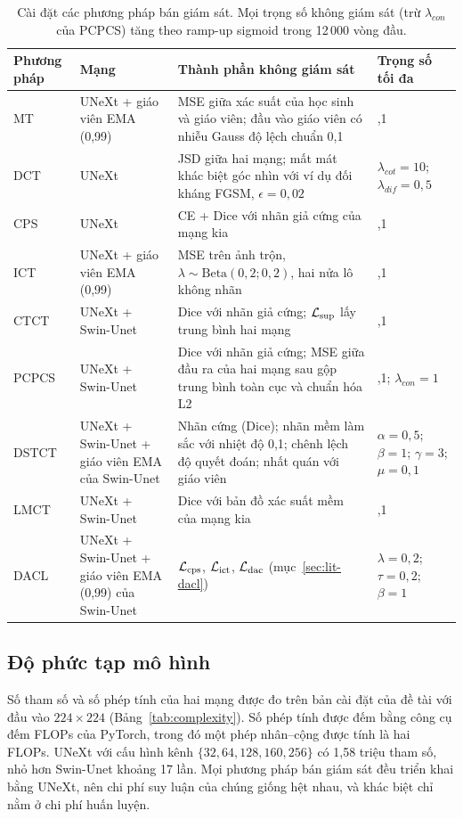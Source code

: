 \begin{table}[ht]
\centering
\caption{Cài đặt các phương pháp bán giám sát. Mọi trọng số không giám sát (trừ $\lambda_{con}$ của PCPCS) tăng theo ramp-up sigmoid trong 12\,000 vòng đầu.}
\label{tab:baselines}
\footnotesize
\begin{tabularx}{\textwidth}{>{\raggedright\arraybackslash}p{1.4cm} >{\raggedright\arraybackslash}p{3.2cm} >{\raggedright\arraybackslash}X >{\raggedright\arraybackslash}p{2.6cm}}
\toprule
Phương pháp & Mạng & Thành phần không giám sát & Trọng số tối đa \\
\midrule
MT & UNeXt + giáo viên EMA (0,99) & MSE giữa xác suất của học sinh và giáo viên; đầu vào giáo viên có nhiễu Gauss độ lệch chuẩn 0,1 & 0,1 \\
DCT & 2 UNeXt & JSD giữa hai mạng; mất mát khác biệt góc nhìn với ví dụ đối kháng FGSM, $\epsilon=0{,}02$ & $\lambda_{cot}=10$; $\lambda_{dif}=0{,}5$ \\
CPS & 2 UNeXt & CE + Dice với nhãn giả cứng của mạng kia & 0,1 \\
ICT & UNeXt + giáo viên EMA (0,99) & MSE trên ảnh trộn, $\lambda\sim\mathrm{Beta}(0{,}2;0{,}2)$, hai nửa lô không nhãn & 0,1 \\
CTCT & UNeXt + Swin-Unet & Dice với nhãn giả cứng; $\mathcal{L}_{\mathrm{sup}}$ lấy trung bình hai mạng & 0,1 \\
PCPCS & UNeXt + Swin-Unet & Dice với nhãn giả cứng; MSE giữa đầu ra của hai mạng sau gộp trung bình toàn cục và chuẩn hóa L2 & 0,1; $\lambda_{con}=1$ \\
DSTCT & UNeXt + Swin-Unet + giáo viên EMA của Swin-Unet & Nhãn cứng (Dice); nhãn mềm làm sắc với nhiệt độ 0,1; chênh lệch độ quyết đoán; nhất quán với giáo viên & $\alpha=0{,}5$; $\beta=1$; $\gamma=3$; $\mu=0{,}1$ \\
LMCT & UNeXt + Swin-Unet & Dice với bản đồ xác suất mềm của mạng kia & 0,1 \\
DACL & UNeXt + Swin-Unet + giáo viên EMA (0,99) của Swin-Unet & $\mathcal{L}_{\mathrm{cps}}$, $\mathcal{L}_{\mathrm{ict}}$, $\mathcal{L}_{\mathrm{dac}}$ (mục~\ref{sec:lit-dacl}) & $\lambda=0{,}2$; $\tau=0{,}2$; $\beta=1$ \\
\bottomrule
\end{tabularx}
\end{table}

\subsection{Độ phức tạp mô hình}
\label{sec:complexity}

Số tham số và số phép tính của hai mạng được đo trên bản cài đặt của đề tài với đầu vào $224\times224$ (Bảng~\ref{tab:complexity}). Số phép tính được đếm bằng công cụ đếm FLOPs của PyTorch, trong đó một phép nhân--cộng được tính là hai FLOPs. UNeXt với cấu hình kênh $\{32,64,128,160,256\}$ có 1,58 triệu tham số, nhỏ hơn Swin-Unet khoảng 17 lần. Mọi phương pháp bán giám sát đều triển khai bằng UNeXt, nên chi phí suy luận của chúng giống hệt nhau, và khác biệt chỉ nằm ở chi phí huấn luyện.

